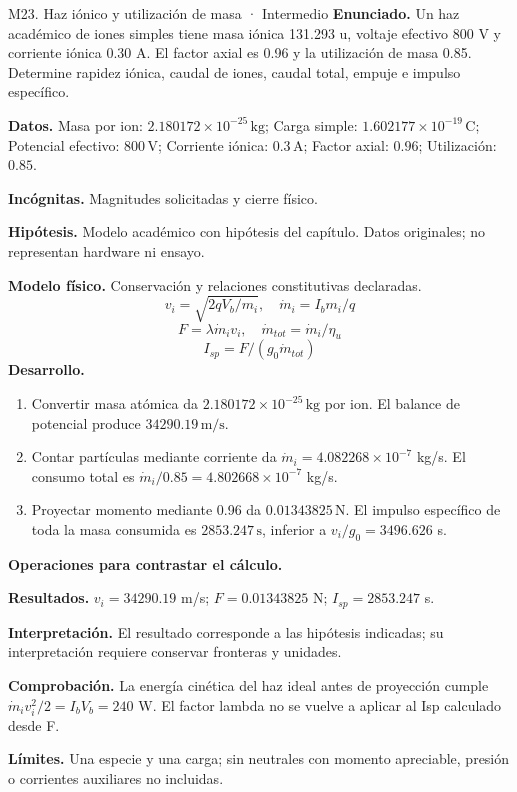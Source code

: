 \begin{studiumworked}{M23. Haz iónico y utilización de masa · Intermedio}
\textbf{Enunciado.} Un haz académico de iones simples tiene masa iónica 131.293 u, voltaje efectivo 800 V y corriente iónica 0.30 A. El factor axial es 0.96 y la utilización de masa 0.85. Determine rapidez iónica, caudal de iones, caudal total, empuje e impulso específico.

\textbf{Datos.} Masa por ion: $2.180172\times10^{-25}\,\mathrm{kg}$; Carga simple: $1.602177\times10^{-19}\,\mathrm{C}$; Potencial efectivo: $800\,\mathrm{V}$; Corriente iónica: $0.3\,\mathrm{A}$; Factor axial: $0.96$; Utilización: $0.85$.

\textbf{Incógnitas.} Magnitudes solicitadas y cierre físico.

\textbf{Hipótesis.} Modelo académico con hipótesis del capítulo. Datos originales; no representan hardware ni ensayo.

\textbf{Modelo físico.} Conservación y relaciones constitutivas declaradas.
\[v_i=\sqrt{2qV_b/m_i},\quad \dot m_i=I_bm_i/q\]
\[F=\lambda\dot m_iv_i,\quad\dot m_{tot}=\dot m_i/\eta_u\]
\[I_{sp}=F/(g_0\dot m_{tot})\]
\textbf{Desarrollo.}
\begin{enumerate}
\item Convertir masa atómica da $2.180172\times10^{-25}\,\mathrm{kg}$ por ion. El balance de potencial produce $34290.19\,\mathrm{m/s}$.
\item Contar partículas mediante corriente da $\dot m_i=4.082268\times10^{-7}$ kg/s. El consumo total es $\dot m_i/0.85=4.802668\times10^{-7}$ kg/s.
\item Proyectar momento mediante 0.96 da $0.01343825\,\mathrm{N}$. El impulso específico de toda la masa consumida es $2853.247\,\mathrm{s}$, inferior a $v_i/g_0=3496.626$ s.
\end{enumerate}
\textbf{Operaciones para contrastar el cálculo.}

\textbf{Resultados.} $v_i=34290.19$ m/s; $F=0.01343825$ N; $I_{sp}=2853.247$ s.

\textbf{Interpretación.} El resultado corresponde a las hipótesis indicadas; su interpretación requiere conservar fronteras y unidades.

\textbf{Comprobación.} La energía cinética del haz ideal antes de proyección cumple $\dot m_i v_i^2/2=I_bV_b=240$ W. El factor lambda no se vuelve a aplicar al Isp calculado desde F.

\textbf{Límites.} Una especie y una carga; sin neutrales con momento apreciable, presión o corrientes auxiliares no incluidas.
\end{studiumworked}

